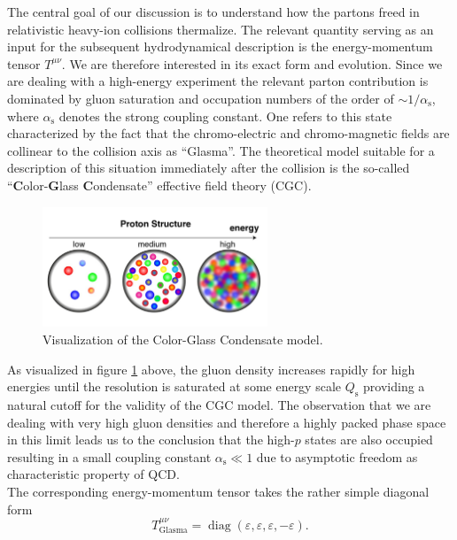 \noindent 
The central goal of our discussion is to understand how the partons freed in relativistic heavy-ion collisions thermalize. The relevant quantity serving as an input for the subsequent hydrodynamical description is the energy-momentum tensor $T^{\mu\nu}$. We are therefore interested in its exact form and evolution. Since we are dealing with a high-energy experiment the relevant parton contribution is dominated by gluon saturation and occupation numbers of the order of $\sim 1/\alpha_{\mathrm{s}}$, where $\alpha_{\mathrm{s}}$ denotes the strong coupling constant. One refers to this state characterized by the fact that the chromo-electric and chromo-magnetic fields are collinear to the collision axis as \enquote{Glasma}. The theoretical model suitable for a description of this situation immediately after the collision is the so-called \enquote{\textbf{C}olor-\textbf{G}lass \textbf{C}ondensate} effective field theory (CGC). \newpage
\begin{figure}[t]
	\centering
	\includegraphics[width=0.6\textwidth]{figures/cqc}
	\caption[Visualization of the Color-Glass Condensate model.]{Visualization of the Color-Glass Condensate model.\footnotemark}
	\label{fig:cgc}
\end{figure}
\noindent
As visualized in figure \ref{fig:cgc} above, the gluon density increases rapidly for high energies until the resolution is saturated at some energy scale $Q_{\mathrm{s}}$ providing a natural cutoff for the validity of the CGC model. The observation that we are dealing with very high gluon densities and therefore a highly packed phase space in this limit leads us to the conclusion that the high-$p$ states are also occupied resulting in a small coupling constant $\alpha_{\mathrm{s}} \ll 1$ due to asymptotic freedom as characteristic property of QCD.\\
The corresponding energy-momentum tensor takes the rather simple diagonal form 
\begin{equation}
	 T^{\mu\nu}_{\mathrm{Glasma}}= \operatorname{diag}(\varepsilon,\varepsilon,\varepsilon,-\varepsilon).
\end{equation}
